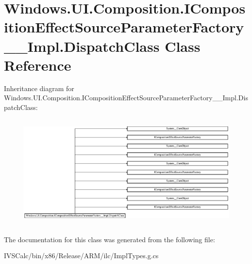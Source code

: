 \hypertarget{class_windows_1_1_u_i_1_1_composition_1_1_i_composition_effect_source_parameter_factory_____impl_1_1_dispatch_class}{}\section{Windows.\+U\+I.\+Composition.\+I\+Composition\+Effect\+Source\+Parameter\+Factory\+\_\+\+\_\+\+Impl.\+Dispatch\+Class Class Reference}
\label{class_windows_1_1_u_i_1_1_composition_1_1_i_composition_effect_source_parameter_factory_____impl_1_1_dispatch_class}
Inheritance diagram for Windows.\+U\+I.\+Composition.\+I\+Composition\+Effect\+Source\+Parameter\+Factory\+\_\+\+\_\+\+Impl.\+Dispatch\+Class\+:\begin{figure}[H]
\begin{center}
\leavevmode
\includegraphics[height=5.833333cm]{class_windows_1_1_u_i_1_1_composition_1_1_i_composition_effect_source_parameter_factory_____impl_1_1_dispatch_class}
\end{center}
\end{figure}


The documentation for this class was generated from the following file\+:\begin{DoxyCompactItemize}
\item 
I\+V\+S\+Calc/bin/x86/\+Release/\+A\+R\+M/ilc/Impl\+Types.\+g.\+cs\end{DoxyCompactItemize}
